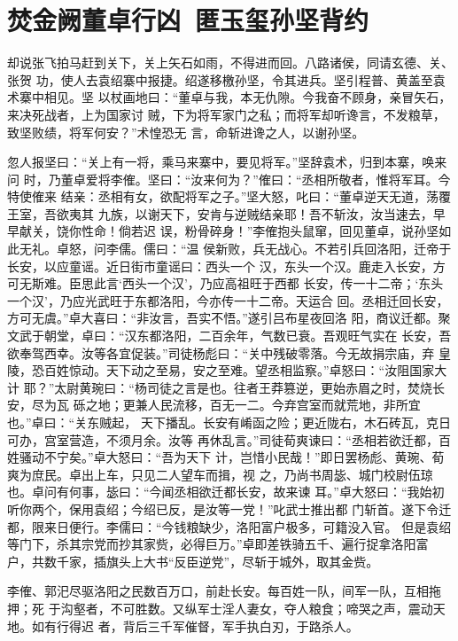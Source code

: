 \chapter{焚金阙董卓行凶~匿玉玺孙坚背约}

却说张飞拍马赶到关下，关上矢石如雨，不得进而回。八路诸侯，同请玄德、关、张贺
功，使人去袁绍寨中报捷。绍遂移檄孙坚，令其进兵。坚引程普、黄盖至袁术寨中相见。坚
以杖画地曰：“董卓与我，本无仇隙。今我奋不顾身，亲冒矢石，来决死战者，上为国家讨
贼，下为将军家门之私；而将军却听谗言，不发粮草，致坚败绩，将军何安？”术惶恐无
言，命斩进谗之人，以谢孙坚。

忽人报坚曰：“关上有一将，乘马来寨中，要见将军。”坚辞袁术，归到本寨，唤来问
时，乃董卓爱将李傕。坚曰：“汝来何为？”傕曰：“丞相所敬者，惟将军耳。今特使傕来
结亲：丞相有女，欲配将军之子。”坚大怒，叱曰：“董卓逆天无道，荡覆王室，吾欲夷其
九族，以谢天下，安肯与逆贼结亲耶！吾不斩汝，汝当速去，早早献关，饶你性命！倘若迟
误，粉骨碎身！”李傕抱头鼠窜，回见董卓，说孙坚如此无礼。卓怒，问李儒。儒曰：“温
侯新败，兵无战心。不若引兵回洛阳，迁帝于长安，以应童谣。近日街市童谣曰：西头一个
汉，东头一个汉。鹿走入长安，方可无斯难。臣思此言‘西头一个汉’，乃应高祖旺于西都
长安，传一十二帝；‘东头一个汉’，乃应光武旺于东都洛阳，今亦传一十二帝。天运合
回。丞相迁回长安，方可无虞。”卓大喜曰：“非汝言，吾实不悟。”遂引吕布星夜回洛
阳，商议迁都。聚文武于朝堂，卓曰：“汉东都洛阳，二百余年，气数已衰。吾观旺气实在
长安，吾欲奉驾西幸。汝等各宜促装。”司徒杨彪曰：“关中残破零落。今无故捐宗庙，弃
皇陵，恐百姓惊动。天下动之至易，安之至难。望丞相监察。”卓怒曰：“汝阻国家大计
耶？”太尉黄琬曰：“杨司徒之言是也。往者王莽篡逆，更始赤眉之时，焚烧长安，尽为瓦
砾之地；更兼人民流移，百无一二。今弃宫室而就荒地，非所宜也。”卓曰：“关东贼起，
天下播乱。长安有崤函之险；更近陇右，木石砖瓦，克日可办，宫室营造，不须月余。汝等
再休乱言。”司徒荀爽谏曰：“丞相若欲迁都，百姓骚动不宁矣。”卓大怒曰：“吾为天下
计，岂惜小民哉！”即日罢杨彪、黄琬、荀爽为庶民。卓出上车，只见二人望车而揖，视
之，乃尚书周毖、城门校尉伍琼也。卓问有何事，毖曰：“今闻丞相欲迁都长安，故来谏
耳。”卓大怒曰：“我始初听你两个，保用袁绍；今绍已反，是汝等一党！”叱武士推出都
门斩首。遂下令迁都，限来日便行。李儒曰：“今钱粮缺少，洛阳富户极多，可籍没入官。
但是袁绍等门下，杀其宗党而抄其家赀，必得巨万。”卓即差铁骑五千、遍行捉拿洛阳富
户，共数千家，插旗头上大书“反臣逆党”，尽斩于城外，取其金赀。

李傕、郭汜尽驱洛阳之民数百万口，前赴长安。每百姓一队，间军一队，互相拖押；死
于沟壑者，不可胜数。又纵军士淫人妻女，夺人粮食；啼哭之声，震动天地。如有行得迟
者，背后三千军催督，军手执白刃，于路杀人。

